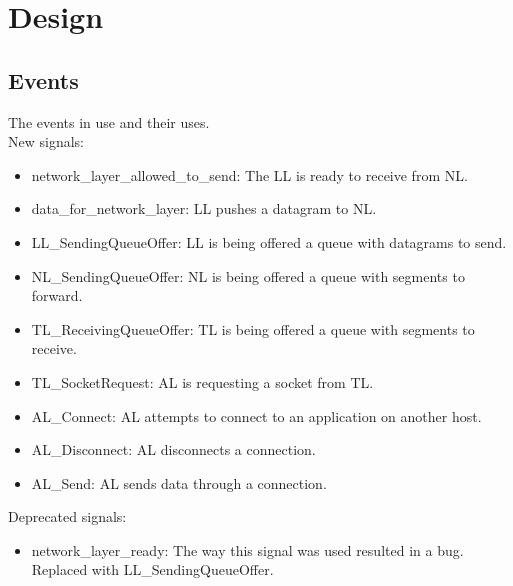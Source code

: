 \section{Design}

%

\subsection{Events}
The events in use and their uses.\\

New signals:
\begin{itemize}
\item network\_layer\_allowed\_to\_send: The LL is ready to receive from NL.
\item data\_for\_network\_layer: LL pushes a datagram to NL.
\item LL\_SendingQueueOffer: LL is being offered a queue with datagrams to send.
\item NL\_SendingQueueOffer: NL is being offered a queue with segments to forward.
\item TL\_ReceivingQueueOffer: TL is being offered a queue with segments to receive.
\item TL\_SocketRequest: AL is requesting a socket from TL.
\item AL\_Connect: AL attempts to connect to an application on another host.
\item AL\_Disconnect: AL disconnects a connection.
\item AL\_Send: AL sends data through a connection.
\end{itemize}

Deprecated signals:
\begin{itemize}
\item network\_layer\_ready: The way this signal was used resulted in a bug. Replaced with LL\_SendingQueueOffer.
\end{itemize}

